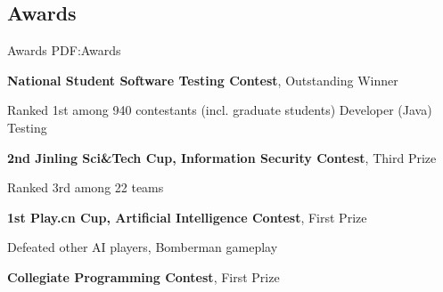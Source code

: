 \documentclass[a4paper,MMMyyyy,nonstop]{simpleresumecv}
\begin{document}
\begin{body}





\section
{Awards}
{Awards}
{PDF:Awards}

\textbf{National Student Software Testing Contest}, Outstanding Winner
\hfill
\textbf{  }

\SubItem
Ranked 1st among 940 contestants (incl. graduate students)
\SubItem
Developer (Java) Testing


\GapNoBreak

\textbf{2nd Jinling Sci\&Tech Cup, Information Security Contest}, Third Prize
\hfill
\textbf{  }
\begin{detail}
\SubItem
Ranked 3rd among 22 teams
\end{detail}

\GapNoBreak

\textbf{1st Play.cn Cup, Artificial Intelligence Contest}, First Prize
\hfill
\textbf{  }
\begin{detail}
\SubItem
Defeated other AI players, Bomberman gameplay
\end{detail}

\GapNoBreak

\textbf{Collegiate Programming Contest}, First Prize
\hfill
\textbf{  }


\end{body}
\end{document}
